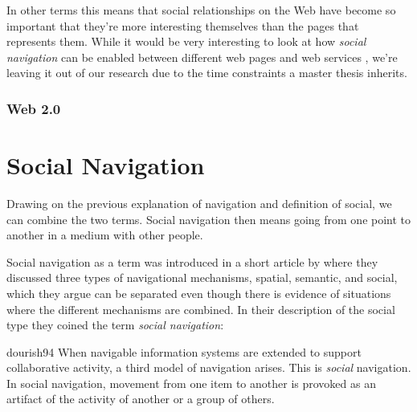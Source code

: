 In other terms this means that social relationships on the Web have become so
important that they're more interesting themselves than the pages that
represents them. While it would be very interesting to look at how
\emph{social navigation} can be enabled between
different web pages and web services%
, we're leaving it out of our research
due to the time constraints a master thesis inherits.

\subsubsection{Web 2.0}


\section{Social Navigation}
\label{section:background.social.navigation}
Drawing on the previous explanation of navigation and definition of social, we
can combine the two terms. Social navigation then means going from one point
to another in a medium with other people.

Social navigation as a term was introduced in a short article by
\citet{dourish94} where they discussed three types of navigational mechanisms,
spatial, semantic, and social, which they argue can be separated even though
there is evidence of situations where the different mechanisms are combined.
In their description of the social type they coined the term
\emph{social navigation}:

\begin{citequote}[p.~1]{dourish94}
  When navigable information systems are extended to support collaborative
  activity, a third model of navigation arises. This is \emph{social}
  navigation. In social navigation, movement from one item to another is
  provoked as an artifact of the activity of another or a group of others.
\end{citequote}

